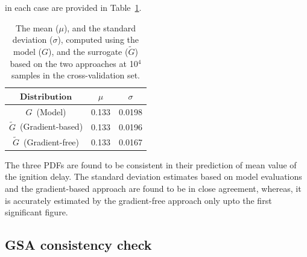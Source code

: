 in each case are provided in Table~\ref{tab:stats}. 
%
\begin{table}[htbp]
\begin{center}
\begin{tabular}{ccc}
\toprule
$\textbf{Distribution}$ & $\mu$ & $\sigma$ \\ 
\bottomrule
$G$~(Model) & 0.133 & 0.0198 \\
$\tilde{G}$~(Gradient-based) & 0.133 & 0.0196 \\
$\tilde{G}$~(Gradient-free) & 0.133 & 0.0167 \\
\bottomrule
\end{tabular}
\caption{The mean ($\mu$), and the standard deviation ($\sigma$), computed using the model ($G$), and
the surrogate ($\tilde{G}$) based on the two approaches at 10$^4$ samples in the cross-validation
set.}
\label{tab:stats}
\end{center}
\end{table}
%
The three PDFs are found to be
consistent in their prediction of mean value of the ignition delay.  The standard deviation estimates based on model
evaluations and the gradient-based approach are found to be in close agreement, whereas, it  is accurately estimated
by the gradient-free approach only upto the first significant figure. 

\subsection{GSA consistency check}

